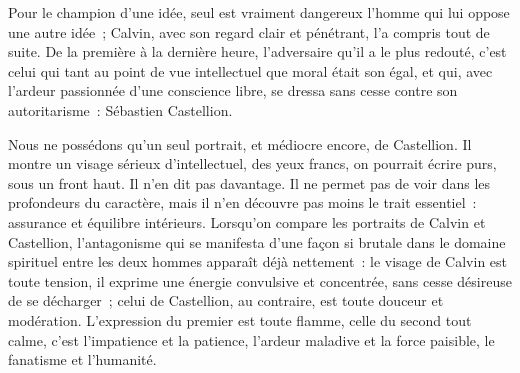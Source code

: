 \documentclass[french,twoside]{book} %
\begin{document}
\noindent Pour le champion d’une idée, seul est vraiment dangereux l’homme qui lui oppose une autre idée ; Calvin, avec son regard clair et pénétrant, l’a compris tout de suite. De la première à la dernière heure, l’adversaire qu’il a le plus redouté, c’est celui qui tant au point de vue intellectuel que moral était son égal, et qui, avec l’ardeur passionnée d’une conscience libre, se dressa sans cesse contre son autoritarisme : Sébastien Castellion.\par
Nous ne possédons qu’un seul portrait, et médiocre encore, de Castellion. Il montre un visage sérieux d’intellectuel, des yeux francs, on pourrait écrire purs, sous un front haut. Il n’en dit pas davantage. Il ne permet pas de voir dans les profondeurs du caractère, mais il n’en découvre pas moins le trait essentiel : assurance et équilibre intérieurs. Lorsqu’on compare les portraits de Calvin et Castellion, l’antagonisme qui se manifesta d’une façon si brutale dans le domaine spirituel entre les deux hommes apparaît déjà nettement : le visage de Calvin est toute tension, il exprime une énergie convulsive et concentrée, sans cesse désireuse de se décharger ; celui de Castellion, au contraire, est toute douceur et modération. L’expression du premier est toute flamme, celle du second tout calme, c’est l’impatience et la patience, l’ardeur maladive et la force paisible, le fanatisme et l’humanité.\par
\end{document}
